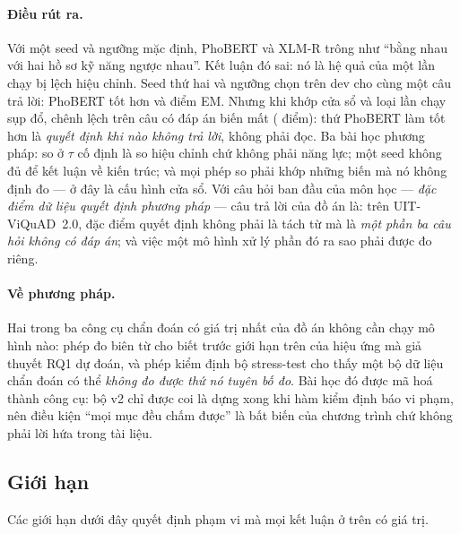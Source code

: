 \paragraph{Điều rút ra.} Với một seed và ngưỡng mặc định, PhoBERT và XLM-R trông như ``bằng nhau với hai hồ
sơ kỹ năng ngược nhau''. Kết luận đó sai: nó là hệ quả của một lần chạy bị lệch hiệu chỉnh. Seed thứ hai và
ngưỡng chọn trên dev cho cùng một câu trả lời: PhoBERT tốt hơn \PairTDiff{} và \PairSTDiff{} điểm EM. Nhưng khi
khớp cửa sổ và loại lần chạy sụp đổ, chênh lệch trên câu có đáp án biến mất (\PairMAnsDiff{} điểm): thứ PhoBERT
làm tốt hơn là \emph{quyết định khi nào không trả lời}, không phải đọc. Ba bài học phương pháp: so ở $\tau$ cố
định là so hiệu chỉnh chứ không phải năng lực; một seed không đủ để kết luận về kiến trúc; và mọi phép so phải
khớp những biến mà nó không định đo --- ở đây là cấu hình cửa sổ. Với
câu hỏi ban đầu của môn học --- \emph{đặc điểm dữ liệu quyết định phương pháp} --- câu trả lời của đồ án là:
trên UIT-ViQuAD~2.0, đặc điểm quyết định không phải là tách từ mà là \emph{một phần ba câu hỏi không có đáp
án}; và việc một mô hình xử lý phần đó ra sao phải được đo riêng.

\paragraph{Về phương pháp.} Hai trong ba công cụ chẩn đoán có giá trị nhất của đồ án không cần chạy mô hình
nào: phép đo biên từ cho biết trước giới hạn trên của hiệu ứng mà giả thuyết RQ1 dự đoán, và phép kiểm định
bộ stress-test cho thấy một bộ dữ liệu chẩn đoán có thể \emph{không đo được thứ nó tuyên bố đo}. Bài học đó
được mã hoá thành công cụ: bộ v2 chỉ được coi là dựng xong khi hàm kiểm định báo \StressViol{} vi phạm, nên
điều kiện ``mọi mục đều chấm được'' là bất biến của chương trình chứ không phải lời hứa trong tài liệu.

\subsection{Giới hạn}
\label{sec:limitations}

Các giới hạn dưới đây quyết định phạm vi mà mọi kết luận ở trên có giá trị.

